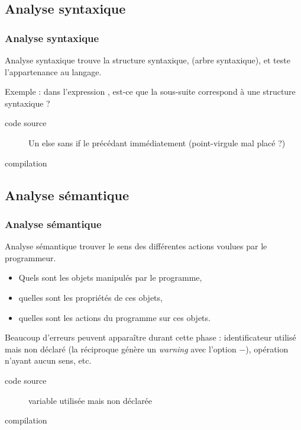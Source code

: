 \documentclass[xcolor=svgnames]{beamer}
\begin{document}
\subsection{Analyse syntaxique}
\begin{frame}
  \frametitle{Analyse syntaxique}
\begin{block}{Analyse syntaxique} 
trouve la structure syntaxique, (arbre
  syntaxique), et teste l'appartenance au langage. 
\end{block}
\pause
Exemple : dans l'expression , est-ce que la sous-suite   correspond à une structure syntaxique ?
\pause
\begin{center}
\end{center}
\pause
\begin{description}
\item[code source] Un else sans if le précédant immédiatement (point-virgule mal placé ?)
\item[compilation]  
\end{description}

\end{frame}

\subsection{Analyse sémantique}
\begin{frame}
\frametitle{Analyse sémantique}
\begin{block}{Analyse sémantique}
  trouver le sens des différentes actions
  voulues par le programmeur.
  \begin{itemize}
  \item Quels sont les objets manipulés par le programme,
  \item quelles sont les propriétés de ces objets,
  \item quelles sont les actions du programme sur ces objets.
  \end{itemize}

\end{block}
\pause
Beaucoup d'erreurs peuvent apparaître durant cette phase : identificateur utilisé mais non
déclaré (la réciproque génère un \emph{warning} avec l'option $-$), opération n'ayant
aucun sens, etc.


\begin{description}
\item[code source] variable  utilisée mais non déclarée
\item[compilation] 
\end{description}
\end{frame}
\end{document}
